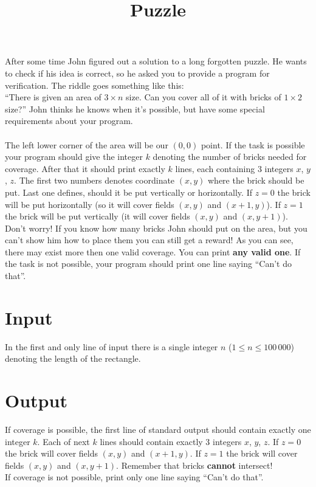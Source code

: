 \documentclass[zad,zawodnik,utf8,en]{sinol}
\title{Puzzle}
\begin{document}
\begin{tasktext}

  \noindent
  After some time John figured out a solution to a long forgotten puzzle.
  He wants to check if his idea is correct, so he asked you to provide a program for verification.
  The riddle goes something like this:\\
  ``There is given an area of $3 \times n$ size. Can you cover all of it with bricks of $1 \times 2$ size?''
  John thinks he knows when it's possible, but have some special requirements about your program.\\ \\
  The left lower corner of the area will be our $(0, 0)$ point.
  If the task is possible your program should give the integer $k$
  denoting the number of bricks needed for coverage.
  After that it should print exactly $k$ lines, each containing 3 integers $x$, $y$, $z$.
  The first two numbers denotes coordinate $(x, y)$ where the brick should be put.
  Last one defines, should it be put vertically or horizontally.
  If $z = 0$ the brick will be put horizontally (so it will cover fields $(x, y)$ and $(x + 1, y)$).
  If $z = 1$ the brick will be put vertically (it will cover fields $(x, y)$ and $(x, y + 1)$).
  Don't worry! If you know how many bricks John should put on the area,
  but you can't show him how to place them you can still get a reward!
  As you can see, there may exist more then one valid coverage. You can print \textbf{any valid one}.
  If the task is not possible, your program should print one line saying ``Can't do that''.


  \section{Input}

    In the first and only line of input there is
    a single integer $n$ ($1 \leq n \leq 100\,000$) denoting the length of the rectangle.

  \section{Output}

    If coverage is possible, the first line of standard output should contain exactly one integer $k$.
    Each of next $k$ lines should contain exactly 3 integers $x$, $y$, $z$.
    If $z = 0$ the brick will cover fields $(x, y)$ and $(x + 1, y)$.
    If $z = 1$ the brick will cover fields $(x, y)$ and $(x, y + 1)$.
    Remember that bricks \textbf{cannot} intersect!\\
    If coverage is not possible, print only one line saying ``Can't do that''.
    
  \examplesection

\end{tasktext}
\end{document}
